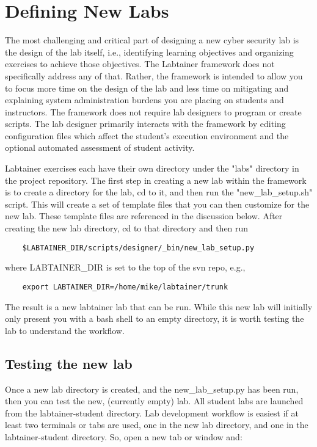 \documentclass{article}
\begin{document}
\section {Defining New Labs}
\label{sec:new_labs}
The most challenging and critical part of designing a new cyber security lab
is the design of the lab itself, i.e., identifying learning objectives and
organizing exercises to achieve those objectives.  The Labtainer framework
does not specifically address any of that.  Rather, the framework is intended
to allow you to focus more time on the design of the lab and less time on mitigating and
explaining system administration burdens you are placing on students and instructors.
The framework does not require lab designers to program or create scripts.  The
lab designer primarily interacts with the framework by editing configuration files
which affect the student's execution environment and the optional automated
assessment of student activity.

Labtainer exercises each have their own
directory under the "labs" directory in the project repository.
The first step in creating a new lab within the framework is to create
a directory for the lab, cd to it, and then run the "new\_lab\_setup.sh" script.
This will create a set of template files that you can then customize
for the new lab.  These template files are referenced in the discussion
below.  After creating the new lab directory, cd to that directory and then run

\begin{verbatim}
    $LABTAINER_DIR/scripts/designer/_bin/new_lab_setup.py
\end{verbatim}
where LABTAINER\_DIR is set to the top of the svn repo, e.g.,

\begin{verbatim}
    export LABTAINER_DIR=/home/mike/labtainer/trunk
\end{verbatim}

The result is a new labtainer lab that can be run.  While this new
lab will initially only present you with a bash shell to an
empty directory, it is worth testing the lab to understand the workflow.

\subsection{Testing the new lab}
Once a new lab directory is created, and the new\_lab\_setup.py has been run, then 
you can test the new, (currently empty) lab.  All student labs are launched from the
labtainer-student directory.  Lab development workflow is easiest if at least two
terminals or tabs are used, one in the new lab directory, and one in the labtainer-student
directory.  So, open a new tab or window and:
\end{document}
